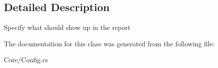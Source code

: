 \subsection{Detailed Description}
Specify what should show up in the report 



The documentation for this class was generated from the following file\-:\begin{DoxyCompactItemize}
\item 
Core/Config.\-cs\end{DoxyCompactItemize}
